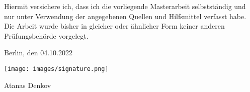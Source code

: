 
Hiermit versichere ich, dass ich die vorliegende Masterarbeit selbstständig und nur unter Verwendung der angegebenen Quellen und Hilfsmittel verfasst habe. Die Arbeit wurde bisher in gleicher oder ähnlicher Form keiner anderen Prüfungsbehörde vorgelegt.

\vskip 1cm

Berlin, den 04.10.2022

\vskip 0.5cm

\raggedright\texttt{[image: images/signature.png]}

Atanas Denkov
